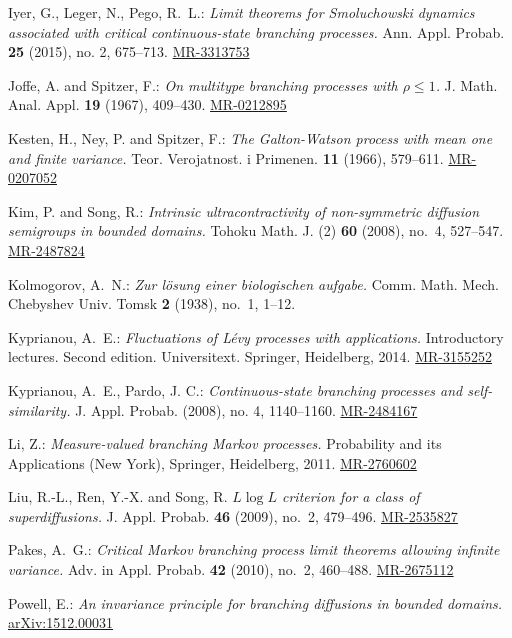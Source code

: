 \documentclass[12pt, a4paper]{amsart}
\def\MR#1{\href{http://www.ams.org/mathscinet-getitem?mr=#1}{MR-#1}}
\def\ARXIV#1{\href{https://arxiv.org/abs/#1}{arXiv:#1}}
\theoremstyle{definition}
\numberwithin{equation}{section}
\begin{document}
\begin{thebibliography}{10}
	Iyer, G., Leger, N., Pego, R.~L.:
	\emph{Limit theorems for Smoluchowski dynamics associated with critical continuous-state branching processes.}
	Ann. Appl. Probab. \textbf{25} (2015), no. 2, 675–713.
	\MR{3313753}
	
	Joffe, A. and Spitzer, F.:
	\emph{On multitype branching processes with {$\rho \leq 1$}.} 
	J. Math. Anal. Appl. \textbf{19} (1967), 409--430. 
	\MR{0212895}
	
	Kesten, H., Ney, P. and Spitzer, F.: 
	\emph{The {G}alton-{W}atson process with mean one and finite variance.} 
	Teor. Verojatnost. i Primenen. \textbf{11} (1966), 579--611. 
	\MR{0207052}
	
	Kim, P. and Song, R.: 
	\emph{Intrinsic ultracontractivity of non-symmetric diffusion semigroups in bounded domains.} 
	Tohoku Math. J. (2) \textbf{60} (2008), no.~4, 527--547. 
	\MR{2487824}
	
	Kolmogorov, A.~N.: 
	\emph{Zur l{\"o}sung einer biologischen aufgabe.} 
	Comm. Math. Mech. Chebyshev Univ. Tomsk \textbf{2} (1938), no.~1, 1--12.
	
	Kyprianou, A.~E.:
	\emph{Fluctuations of Lévy processes with applications.} 
	Introductory lectures. Second edition. Universitext. Springer, Heidelberg, 2014.
	\MR{3155252}
	
	Kyprianou, A.~E., Pardo, J. C.:
	\emph{Continuous-state branching processes and self-similarity.}
	J. Appl. Probab.  (2008), no. 4, 1140–1160. 
	\MR{2484167}

	Li, Z.: 
	\emph{Measure-valued branching {M}arkov processes.} 
	Probability and its Applications (New York), Springer, Heidelberg, 2011. 
	\MR{2760602}
	
	Liu, R.-L., Ren, Y.-X. and Song, R. 
	\emph{{$L\log L$} criterion for a class of superdiffusions.} 
	J. Appl. Probab. \textbf{46} (2009), no.~2, 479--496.
	\MR{2535827}
	
	Pakes, A.~G.: 
	\emph{Critical {M}arkov branching process limit theorems allowing infinite variance.} 
	Adv. in Appl. Probab. \textbf{42} (2010), no.~2, 460--488. 
	\MR{2675112}
	
	Powell, E.: 
	\emph{An invariance principle for branching diffusions in bounded domains.} 
	\ARXIV{1512.00031}
	

\end{thebibliography}
\end{document}
